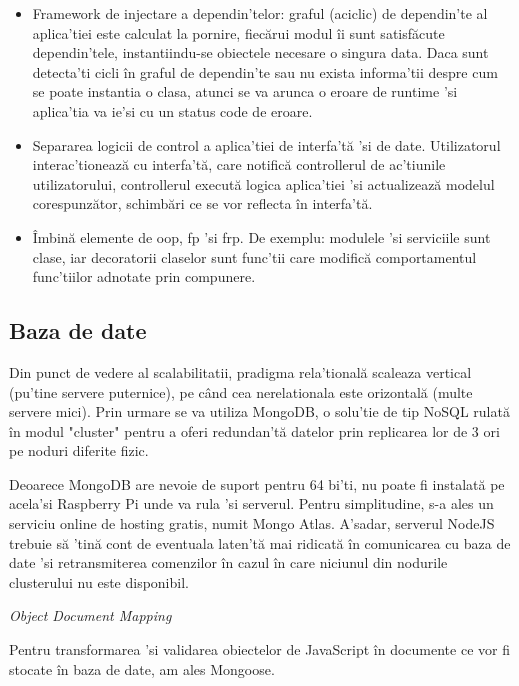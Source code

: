 \begin{itemize}
  \item Framework de injectare a dependin'telor: graful (aciclic) de dependin'te al aplica'tiei este calculat la pornire, fiecărui modul îi sunt satisfăcute dependin'tele, instantiindu-se obiectele necesare o singura data. Daca sunt detecta'ti cicli în graful de dependin'te sau nu exista informa'tii despre cum se poate instantia o clasa, atunci se va arunca o eroare de runtime 'si aplica'tia va ie'si cu un status code de eroare. 
  \item Separarea logicii de control a aplica'tiei de interfa'tă 'si de date. Utilizatorul interac'tionează cu interfa'tă, care notifică controllerul de ac'tiunile utilizatorului, controllerul execută logica aplica'tiei 'si actualizează modelul corespunzător, schimbări ce se vor reflecta în interfa'tă.
  \item Îmbină elemente de \acrfull{oop}, \acrfull{fp} 'si \acrfull{frp}. De exemplu: modulele 'si serviciile sunt clase, iar decoratorii claselor sunt func'tii care modifică comportamentul func'tiilor adnotate prin compunere.

\end{itemize}

\subsection {Baza de date}

Din punct de vedere al scalabilitatii, pradigma rela'tională scaleaza vertical (pu'tine servere puternice), pe când cea nerelationala este orizontală (multe servere mici). Prin urmare se va utiliza MongoDB, o solu'tie de tip NoSQL rulată în modul "cluster" pentru a oferi redundan'tă datelor prin replicarea lor de 3 ori pe noduri diferite fizic.

Deoarece MongoDB are nevoie de suport pentru 64 bi'ti, nu poate fi instalată pe acela'si Raspberry Pi unde va rula 'si serverul. Pentru simplitudine, s-a ales un serviciu online de hosting gratis, numit Mongo Atlas. A'sadar, serverul NodeJS trebuie să 'tină cont de eventuala laten'tă mai ridicată în comunicarea cu baza de date 'si retransmiterea comenzilor în cazul în care niciunul din nodurile clusterului nu este disponibil.

\noindent
\textit{Object Document Mapping}

Pentru transformarea 'si validarea obiectelor de JavaScript în documente ce vor fi stocate în baza de date, am ales Mongoose.


